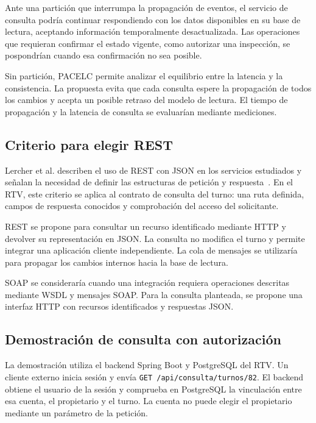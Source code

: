 \documentclass[10pt,a4paper,twocolumn]{article}
\begin{document}
Ante una partición que interrumpa la propagación de eventos, el servicio de consulta podría continuar respondiendo con los datos disponibles en su base de lectura, aceptando información temporalmente desactualizada. Las operaciones que requieran confirmar el estado vigente, como autorizar una inspección, se pospondrían cuando esa confirmación no sea posible.



Sin partición, PACELC permite analizar el equilibrio entre la latencia y la consistencia. La propuesta evita que cada consulta espere la propagación de todos los cambios y acepta un posible retraso del modelo de lectura. El tiempo de propagación y la latencia de consulta se evaluarían mediante mediciones.



\subsection{Criterio para elegir REST}

Lercher et al. describen el uso de REST con JSON en los servicios estudiados y señalan la necesidad de definir las estructuras de petición y respuesta~\cite[sec.~3.2.1]{lercher_microservice_2024}. En el RTV, este criterio se aplica al contrato de consulta del turno: una ruta definida, campos de respuesta conocidos y comprobación del acceso del solicitante.



REST se propone para consultar un recurso identificado mediante HTTP y devolver su representación en JSON. La consulta no modifica el turno y permite integrar una aplicación cliente independiente. La cola de mensajes se utilizaría para propagar los cambios internos hacia la base de lectura.



SOAP se consideraría cuando una integración requiera operaciones descritas mediante WSDL y mensajes SOAP. Para la consulta planteada, se propone una interfaz HTTP con recursos identificados y respuestas JSON.



\subsection{Demostración de consulta con autorización}

La demostración utiliza el backend Spring Boot y PostgreSQL del RTV. Un cliente externo inicia sesión y envía \texttt{GET /api/consulta/turnos/82}. El backend obtiene el usuario de la sesión y comprueba en PostgreSQL la vinculación entre esa cuenta, el propietario y el turno. La cuenta no puede elegir el propietario mediante un parámetro de la petición.
\end{document}
